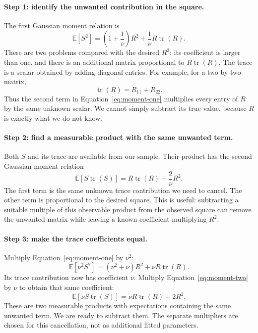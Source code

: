 \documentclass[11pt]{article}
\newcommand{\E}{\mathbb{E}}
\begin{document}
\paragraph{Step 1: identify the unwanted contribution in the square.}
The first Gaussian moment relation is
\begin{equation}
 \E[S^2]=\left(1+\frac1\nu\right)R^2
                   +\frac1\nu R\operatorname{tr}(R).
 \label{eq:moment-one}
\end{equation}
There are two problems compared with the desired $R^2$: its coefficient
is larger than one, and there is an additional matrix proportional to
$R\operatorname{tr}(R)$. The trace is a scalar obtained by adding diagonal
entries. For example, for a two-by-two matrix,
\begin{equation}
 \operatorname{tr}(R)=R_{11}+R_{22}.
\end{equation}
Thus the second term in Equation~\eqref{eq:moment-one} multiplies every
entry of $R$ by the same unknown scalar. We cannot simply subtract its
true value, because $R$ is exactly what we do not know.

\paragraph{Step 2: find a measurable product with the same unwanted term.}
Both $S$ and its trace are available from our sample. Their product has
the second Gaussian moment relation
\begin{equation}
 \E[S\operatorname{tr}(S)]
       =R\operatorname{tr}(R)+\frac2\nu R^2.
 \label{eq:moment-two}
\end{equation}
The first term is the same unknown trace contribution we need to cancel.
The other term is proportional to the desired square. This is useful:
subtracting a suitable multiple of this observable product from the
observed square can remove the unwanted matrix while leaving a known
coefficient multiplying $R^2$.

\paragraph{Step 3: make the trace coefficients equal.}
Multiply Equation~\eqref{eq:moment-one} by $\nu^2$:
\begin{equation}
 \E[\nu^2S^2]=(\nu^2+\nu)R^2
                         +\nu R\operatorname{tr}(R).
\end{equation}
Its trace contribution now has coefficient $\nu$. Multiply
Equation~\eqref{eq:moment-two} by $\nu$ to obtain that same coefficient:
\begin{equation}
 \E[\nu S\operatorname{tr}(S)]
                   =\nu R\operatorname{tr}(R)+2R^2.
\end{equation}
These are two measurable products with expectations containing the same
unwanted term. We are ready to subtract them. The separate multipliers
are chosen for this cancellation, not as additional fitted parameters.
\end{document}
